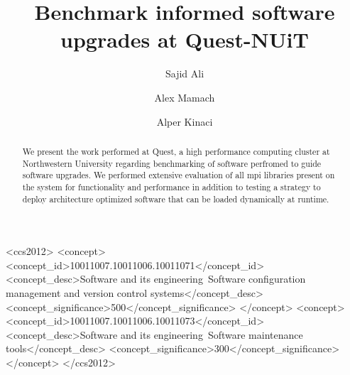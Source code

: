 \documentclass[sigconf,authordraft]{acmart}
\begin{document}
\title{Benchmark informed software upgrades at Quest-NUiT}

\author{Sajid Ali}

\author{Alex Mamach}


\author{Alper Kinaci}


\begin{abstract}
  We present the work performed at Quest, a high performance computing cluster at Northwestern University regarding benchmarking of software perfromed to guide software upgrades. We performed extensive evaluation of all mpi libraries present on the system for functionality and performance in addition to testing a strategy to deploy architecture optimized software that can be loaded dynamically at runtime.
\end{abstract}

\begin{CCSXML}
	<ccs2012>
	<concept>
	<concept_id>10011007.10011006.10011071</concept_id>
	<concept_desc>Software and its engineering~Software configuration management and version control systems</concept_desc>
	<concept_significance>500</concept_significance>
	</concept>
	<concept>
	<concept_id>10011007.10011006.10011073</concept_id>
	<concept_desc>Software and its engineering~Software maintenance tools</concept_desc>
	<concept_significance>300</concept_significance>
	</concept>
	</ccs2012>
\end{CCSXML}
\end{document}
